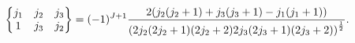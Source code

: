 \[\begin{Bmatrix}j_{1}&j_{2}&j_{3}\\
1&j_{3}&j_{2}\end{Bmatrix}=(-1)^{J+1}\frac{2(j_{2}(j_{2}+1)+j_{3}(j_{3}+1)-j_{%
1}(j_{1}+1))}{\left(2j_{2}(2j_{2}+1)(2j_{2}+2)2j_{3}(2j_{3}+1)(2j_{3}+2)\right%
)^{\frac{1}{2}}}.\]